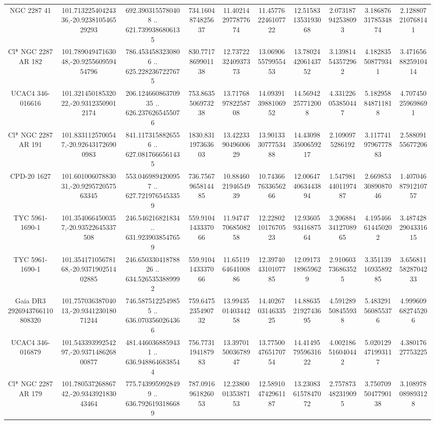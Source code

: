 \begin{table}
\begin{tabular}{cccccccccc}
NGC  2287    41 & 101.71322540424336,-20.923810546529293 & 692.3903155780408 .. 621.7399386806135 & 734.1604874825637 & 11.402142977877674 & 11.457762246107722 & 12.515831353193068 & 2.073187942538093 & 3.1868763178534874 & 2.128807210768141 \\
Cl* NGC 2287     AR     182 & 101.78904947163048,-20.925560959454796 & 786.4534583230806 .. 625.2282367227675 & 830.7717869901138 & 12.737223240937373 & 13.069065579955453 & 13.780244206143752 & 3.139814543572962 & 4.182835508779341 & 3.4716568825910414 \\
UCAC4 346-016616 & 101.32145018532022,-20.93123509012174 & 206.12466086370935 .. 626.2376265455076 & 753.8635506973238 & 13.717689782258708 & 14.093913988106952 & 14.56942257712008 & 4.331226053850447 & 5.182958848711818 & 4.707450259698691 \\
Cl* NGC 2287     AR     191 & 101.8331125700547,-20.926431726900983 & 841.1173158826556 .. 627.0817666561435 & 1830.831197363603 & 13.422339049600629 & 13.901333077753488 & 14.430983500659217 & 2.1090975286192 & 3.1177419796777883 & 2.58809155677206 \\
CPD-20  1627 & 101.60100607883031,-20.929572057563345 & 553.0469894200957 .. 627.7219765453359 & 736.7567965814485 & 10.884602194654939 & 10.743667633656266 & 12.006474063443894 & 1.5479814401197487 & 2.6698533089087046 & 1.4070468791210757 \\
TYC 5961-1690-1 & 101.3540664500357,-20.93522645337508 & 246.546216821834 .. 631.9239038547659 & 559.9104143337066 & 11.947477068508258 & 12.228021017670523 & 12.936059341687564 & 3.2068843412708965 & 4.195466614450202 & 3.4874282904331615 \\
TYC 5961-1690-1 & 101.35417105678168,-20.937190251402885 & 246.65033041878826 .. 634.5265353889992 & 559.9104143337066 & 11.651196464100886 & 12.397404310107785 & 12.09173189659629 & 2.910603736863525 & 3.3511391693589285 & 3.6568115828704233 \\
Gaia DR3 2926943766110808320 & 101.75703638704013,-20.934123018071244 & 746.5875122549855 .. 636.0703560264366 & 759.6475235490732 & 13.994350140344258 & 14.402670314633525 & 14.886352192743695 & 4.591289508455938 & 5.483291560855376 & 4.999609682745206 \\
UCAC4 346-016879 & 101.54339399254297,-20.937148626800877 & 481.4460368859431 .. 636.9488646838544 & 756.7731194187983 & 13.397015003678947 & 13.775004765170754 & 14.414957959631622 & 4.002186516040442 & 5.020129471993117 & 4.38017627753225 \\
Cl* NGC 2287     AR     179 & 101.78053726886742,-20.934392183043464 & 775.7439959928499 .. 636.7926193186689 & 787.0916961826053 & 12.238000135387153 & 12.589104742961187 & 13.230836157847072 & 2.757873482319095 & 3.7507095047790138 & 3.108978089893128 \\

\end{tabular}
\end{table}
